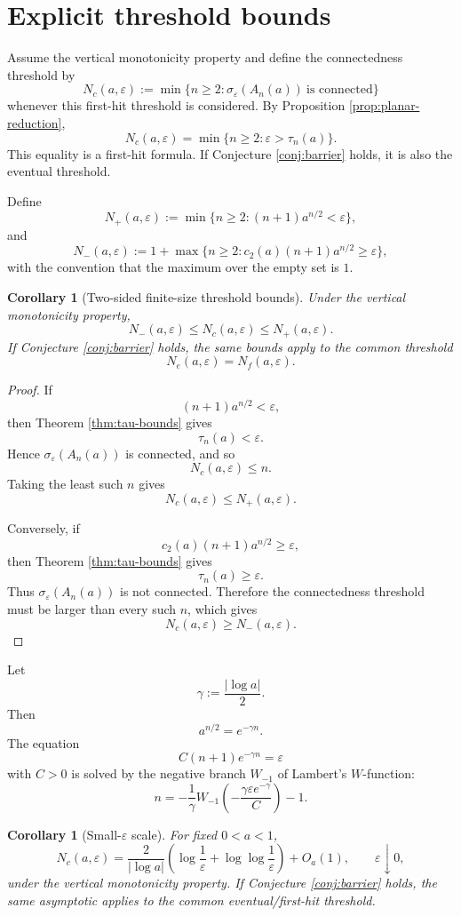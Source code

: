 \documentclass[11pt]{amsart}
\numberwithin{equation}{section}
\newcommand{\eps}{\varepsilon}
\newtheorem{corollary}[theorem]{Corollary}
\begin{document}
\section{Explicit threshold bounds}

Assume the vertical monotonicity property and define the connectedness threshold by
\[
N_c(a,\eps):=\min\{n\ge2:\sigma_\eps(A_n(a))\ \text{is connected}\}
\]
whenever this first-hit threshold is considered.  By Proposition \ref{prop:planar-reduction},
\[
N_c(a,\eps)=\min\{n\ge2:\eps>\tau_n(a)\}.
\]
This equality is a first-hit formula.  If Conjecture \ref{conj:barrier} holds, it is also the eventual threshold.

Define
\[
N_+(a,\eps)
:=
\min\{n\ge2:(n+1)a^{n/2}<\eps\},
\]
and
\[
N_-(a,\eps)
:=
1+\max\{n\ge2:c_2(a)(n+1)a^{n/2}\ge\eps\},
\]
with the convention that the maximum over the empty set is \(1\).

\begin{corollary}[Two-sided finite-size threshold bounds]\label{cor:Nc-bounds}
Under the vertical monotonicity property,
\[
N_-(a,\eps)\le N_c(a,\eps)\le N_+(a,\eps).
\]
If Conjecture \ref{conj:barrier} holds, the same bounds apply to the common threshold
\[
N_e(a,\eps)=N_f(a,\eps).
\]
\end{corollary}

\begin{proof}
If
\[
(n+1)a^{n/2}<\eps,
\]
then Theorem \ref{thm:tau-bounds} gives
\[
\tau_n(a)<\eps.
\]
Hence \(\sigma_\eps(A_n(a))\) is connected, and so
\[
N_c(a,\eps)\le n.
\]
Taking the least such \(n\) gives
\[
N_c(a,\eps)\le N_+(a,\eps).
\]

Conversely, if
\[
c_2(a)(n+1)a^{n/2}\ge\eps,
\]
then Theorem \ref{thm:tau-bounds} gives
\[
\tau_n(a)\ge\eps.
\]
Thus \(\sigma_\eps(A_n(a))\) is not connected.  Therefore the connectedness threshold must be larger than every such \(n\), which gives
\[
N_c(a,\eps)\ge N_-(a,\eps).
\]
\end{proof}

Let
\[
\gamma:=\frac{|\log a|}{2}.
\]
Then
\[
a^{n/2}=e^{-\gamma n}.
\]
The equation
\[
C(n+1)e^{-\gamma n}=\eps
\]
with \(C>0\) is solved by the negative branch \(W_{-1}\) of Lambert's \(W\)-function:
\[
n
=
-\frac1\gamma
W_{-1}\!\left(-\frac{\gamma\eps e^{-\gamma}}{C}\right)-1.
\]

\begin{corollary}[Small-\(\eps\) scale]\label{cor:small-eps}
For fixed \(0<a<1\),
\[
N_c(a,\eps)
=
\frac{2}{|\log a|}
\left(
\log\frac1\eps+\log\log\frac1\eps
\right)
+
O_a(1),
\qquad
\eps\downarrow0,
\]
under the vertical monotonicity property.  If Conjecture \ref{conj:barrier} holds, the same asymptotic applies to the common eventual/first-hit threshold.
\end{corollary}
\end{document}
